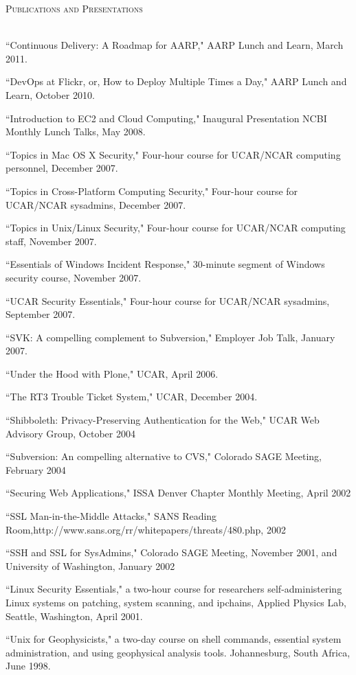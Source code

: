 \documentclass{article}
\newcommand{\lineunder}{\vspace*{-8pt} \\ \hspace*{-18pt} \hrulefill \\}
\newcommand{\header}[1]{{\hspace*{-15pt}\vspace*{6pt} \textsc{#1}} \vspace*{-6pt} \lineunder}
\newenvironment{achievements}{\begin{list}{\topsep 0pt \itemsep -2pt}} {\vspace*{4pt}\end{list}}
\begin{document}
\header{Publications and Presentations}
\begin{achievements}
\item ``Continuous Delivery: A Roadmap for AARP," AARP Lunch and Learn, March 2011.
\item ``DevOps at Flickr, or, How to Deploy Multiple Times a Day," AARP Lunch and Learn, October 2010.
\item ``Introduction to EC2 and Cloud Computing," Inaugural Presentation NCBI Monthly Lunch Talks, May 2008.
\item ``Topics in Mac OS X Security," Four-hour course for UCAR/NCAR computing personnel, December 2007.
\item ``Topics in Cross-Platform Computing Security," Four-hour course for UCAR/NCAR sysadmins, December 2007.  
\item ``Topics in Unix/Linux Security," Four-hour course for UCAR/NCAR computing staff, November 2007.
\item ``Essentials of Windows Incident Response," 30-minute segment of Windows security course, November 2007.
\item ``UCAR Security Essentials,"  Four-hour course for UCAR/NCAR sysadmins, September 2007.
\item ``SVK: A compelling complement to Subversion," Employer Job Talk, January 2007.
\item ``Under the Hood with Plone," UCAR, April 2006.
\item ``The RT3 Trouble Ticket System," UCAR, December 2004.  
\item ``Shibboleth: Privacy-Preserving Authentication for the Web," UCAR Web Advisory Group, October 2004
\item ``Subversion: An compelling alternative to CVS," Colorado SAGE Meeting, February 2004
\item ``Securing Web Applications," ISSA Denver Chapter Monthly Meeting, April 2002
\item ``SSL Man-in-the-Middle Attacks," SANS Reading Room,http://www.sans.org/rr/whitepapers/threats/480.php, 2002
\item ``SSH and SSL for SysAdmins," Colorado SAGE Meeting, November 2001, and University of Washington, January 2002
\item ``Linux Security Essentials," a two-hour course for researchers self-administering Linux systems on patching, system scanning, and ipchains,  Applied Physics Lab, Seattle, Washington, April 2001.
\item ``Unix for Geophysicists," a two-day course on shell commands, essential system administration, and using geophysical analysis tools.  Johannesburg, South Africa, June 1998.
\end{achievements}
\end{document}
